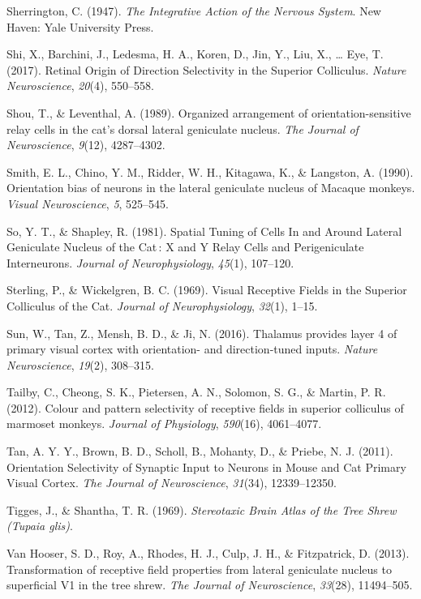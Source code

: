 Sherrington, C. (1947). \emph{The Integrative Action of the Nervous
System}. New Haven: Yale University Press.

Shi, X., Barchini, J., Ledesma, H. A., Koren, D., Jin, Y., Liu, X.,
\ldots{} Eye, T. (2017). Retinal Origin of Direction Selectivity in the
Superior Colliculus. \emph{Nature Neuroscience}, \emph{20}(4), 550--558.

Shou, T., \& Leventhal, A. (1989). Organized arrangement of
orientation-sensitive relay cells in the cat's dorsal lateral geniculate
nucleus. \emph{The Journal of Neuroscience}, \emph{9}(12), 4287--4302.

Smith, E. L., Chino, Y. M., Ridder, W. H., Kitagawa, K., \& Langston, A.
(1990). Orientation bias of neurons in the lateral geniculate nucleus of
Macaque monkeys. \emph{Visual Neuroscience}, \emph{5}, 525--545.

So, Y. T., \& Shapley, R. (1981). Spatial Tuning of Cells In and Around
Lateral Geniculate Nucleus of the Cat\,: X and Y Relay Cells and
Perigeniculate Interneurons. \emph{Journal of Neurophysiology},
\emph{45}(1), 107--120.

Sterling, P., \& Wickelgren, B. C. (1969). Visual Receptive Fields in
the Superior Colliculus of the Cat. \emph{Journal of Neurophysiology},
\emph{32}(1), 1--15.

Sun, W., Tan, Z., Mensh, B. D., \& Ji, N. (2016). Thalamus provides
layer 4 of primary visual cortex with orientation- and direction-tuned
inputs. \emph{Nature Neuroscience}, \emph{19}(2), 308--315.

Tailby, C., Cheong, S. K., Pietersen, A. N., Solomon, S. G., \& Martin,
P. R. (2012). Colour and pattern selectivity of receptive fields in
superior colliculus of marmoset monkeys. \emph{Journal of Physiology},
\emph{590}(16), 4061--4077.

Tan, A. Y. Y., Brown, B. D., Scholl, B., Mohanty, D., \& Priebe, N. J.
(2011). Orientation Selectivity of Synaptic Input to Neurons in Mouse
and Cat Primary Visual Cortex. \emph{The Journal of Neuroscience},
\emph{31}(34), 12339--12350.

Tigges, J., \& Shantha, T. R. (1969). \emph{Stereotaxic Brain Atlas of
the Tree Shrew (Tupaia glis)}.

Van Hooser, S. D., Roy, A., Rhodes, H. J., Culp, J. H., \& Fitzpatrick,
D. (2013). Transformation of receptive field properties from lateral
geniculate nucleus to superficial V1 in the tree shrew. \emph{The
Journal of Neuroscience}, \emph{33}(28), 11494--505.

